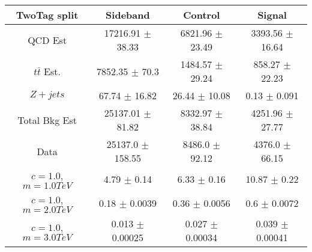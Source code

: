 \begin{footnotesize} 
\begin{tabular}{c|c|c|c} 
TwoTag split & Sideband & Control & Signal \\ 
\hline\hline 
QCD Est & 17216.91 $\pm$ 38.33 & 6821.96 $\pm$ 23.49 & 3393.56 $\pm$ 16.64\\ 
$t\bar{t}$ Est.  & 7852.35 $\pm$ 70.3 & 1484.57 $\pm$ 29.24 & 858.27 $\pm$ 22.23\\ 
$Z+jets$ & 67.74 $\pm$ 16.82 & 26.44 $\pm$ 10.08 & 0.13 $\pm$ 0.091\\ 
Total Bkg Est & 25137.01 $\pm$ 81.82 & 8332.97 $\pm$ 38.84 & 4251.96 $\pm$ 27.77\\ 
Data & 25137.0 $\pm$ 158.55 & 8486.0 $\pm$ 92.12 & 4376.0 $\pm$ 66.15\\ 
$c=1.0$,$m=1.0TeV$ & 4.79 $\pm$ 0.14 & 6.33 $\pm$ 0.16 & 10.87 $\pm$ 0.22\\ 
$c=1.0$,$m=2.0TeV$ & 0.18 $\pm$ 0.0039 & 0.36 $\pm$ 0.0056 & 0.6 $\pm$ 0.0072\\ 
$c=1.0$,$m=3.0TeV$ & 0.013 $\pm$ 0.00025 & 0.027 $\pm$ 0.00034 & 0.039 $\pm$ 0.00041\\ 
\hline\hline 
\end{tabular} 
\end{footnotesize} 
\newline 
